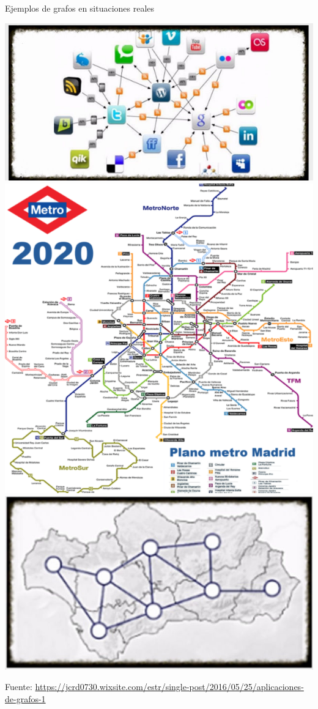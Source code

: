 \begin{ejemplo}
Ejemplos de grafos en situaciones reales

\centerline{\includegraphics[width=.3\textwidth]{input/06-Graph-fig/redsocial}
\includegraphics[width=.3\textwidth]{input/06-Graph-fig/plano-metro-madrid}
\includegraphics[width=.3\textwidth]{input/06-Graph-fig/andalucia}}

Fuente: \url{https://jcrd0730.wixsite.com/estr/single-post/2016/05/25/aplicaciones-de-grafos-1}
\end{ejemplo}



